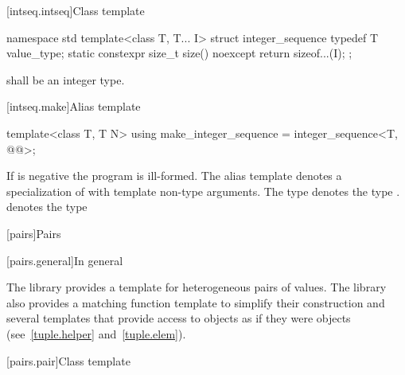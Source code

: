 [intseq.intseq]{Class template }

%
\begin{codeblock}
namespace std {
  template<class T, T... I>
  struct integer_sequence {
    typedef T value_type;
    static constexpr size_t size() noexcept { return sizeof...(I); }
  };
}
\end{codeblock}

\pnum
{} shall be an integer type.

[intseq.make]{Alias template }

%
\begin{itemdecl}
template<class T, T N>
  using make_integer_sequence = integer_sequence<T, @\seebelow{}@>;
\end{itemdecl}

\begin{itemdescr}
\pnum
If  is negative the program is ill-formed. The alias template
 denotes a specialization of
 with  template non-type arguments.
The type  denotes the type
.
\enternote {} denotes the type
 \exitnote
\end{itemdescr}

[pairs]{Pairs}

[pairs.general]{In general}

\pnum
The library provides a template for heterogeneous pairs of values.
The library also provides a matching function template to simplify
their construction and several templates that provide access to 
objects as if they were  objects (see~\ref{tuple.helper}
and~\ref{tuple.elem}).%
%
%
%

[pairs.pair]{Class template }

